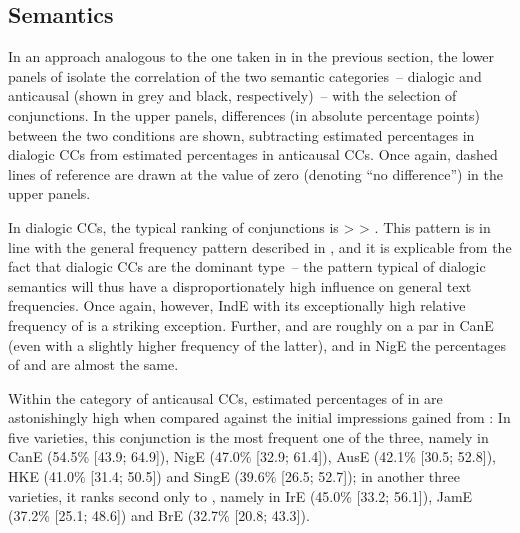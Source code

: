 \subsection{\label{bkm:Ref59897180}Semantics}\label{sec:10.2.2}

In an approach analogous to the one taken in  in the previous section, the lower panels of  isolate the correlation of the two semantic categories~– dialogic and anticausal (shown in grey and black, respectively)~– with the selection of conjunctions. In the upper panels, differences (in absolute percentage points) between the two conditions are shown, subtracting estimated percentages in dialogic CCs from estimated percentages in anticausal CCs. Once again, dashed lines of reference are drawn at the value of zero (denoting “no difference”) in the upper panels.

In dialogic CCs, the typical ranking of conjunctions is  >  > . This pattern is in line with the general frequency pattern described in , and it is explicable from the fact that dialogic CCs are the dominant type~– the pattern typical of dialogic semantics will thus have a disproportionately high influence on general text frequencies. Once again, however, IndE with its exceptionally high relative frequency of  is a striking exception. Further,  and  are roughly on a par in CanE (even with a slightly higher frequency of the latter), and in NigE the percentages of  and  are almost the same.

Within the category of anticausal CCs, estimated percentages of  in  are astonishingly high when compared against the initial impressions gained from : In five varieties, this conjunction is the most frequent one of the three, namely in CanE (54.5\% [43.9; 64.9]), NigE (47.0\% [32.9; 61.4]), AusE (42.1\% [30.5; 52.8]), HKE (41.0\% [31.4; 50.5]) and SingE (39.6\% [26.5; 52.7]); in another three varieties, it ranks second only to , namely in IrE (45.0\% [33.2; 56.1]), JamE (37.2\% [25.1; 48.6]) and BrE (32.7\% [20.8; 43.3]).

